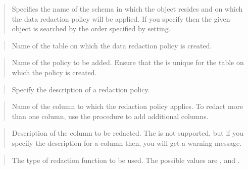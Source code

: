 \documentclass[letterpaper,10pt,english,openany,oneside]{sphinxmanual}
\begin{document}

\begin{quote}

Specifies the name of the schema in which the object resides and on
which the data redaction policy will be applied. If you specify 
then the given object is searched by the order specified by 
setting.
\end{quote}

\begin{quote}

Name of the table on which the data redaction policy is created.
\end{quote}

\begin{quote}

Name of the policy to be added. Ensure that the  is unique
for the table on which the policy is created.
\end{quote}

\begin{quote}

Specify the description of a redaction policy.
\end{quote}

\begin{quote}

Name of the column to which the redaction policy applies. To redact more
than one column, use the  procedure to add additional
columns.
\end{quote}

\begin{quote}

Description of the column to be redacted. The  is not
supported, but if you specify the description for a column then, you
will get a warning message.
\end{quote}

\begin{quote}

The type of redaction function to be used. The possible values are , and .
\end{quote}
\end{document}

